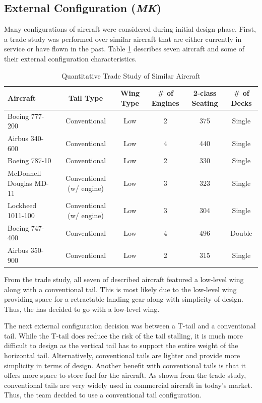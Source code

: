 \subsection{External Configuration  (\textit{MK})}
Many configurations of aircraft were considered during initial design phase. First, a trade study was performed over similar aircraft that are either currently in service or have flown in the past. Table \ref{tabmk1} describes seven aircraft and some of their external configuration characteristics. 

\begin{table}[H]
    \centering
    \caption{Quantitative Trade Study of Similar Aircraft}
    \begin{tabular}{|m{3cm}||c|c|c|c|c|}
    \toprule
    \label{tabmk1}
    \textbf{Aircraft} & \textbf{Tail Type} & \textbf{Wing Type} & \textbf{\# of Engines} & \textbf{2-class Seating} & \textbf{\# of Decks} \\
    \hline\hline
    Boeing 777-200 & Conventional & Low & 2 & 375 & Single \\
    \hline
    Airbus 340-600 & Conventional & Low & 4 & 440 & Single \\
    \hline
    Boeing 787-10 & Conventional & Low & 2 & 330 & Single \\
    \hline
    McDonnell Douglas MD-11 & Conventional (w/ engine) & Low & 3 & 323 & Single \\
    \hline
    Lockheed 1011-100 & Conventional (w/ engine) & Low & 3 & 304 & Single \\
    \hline
    Boeing 747-400 & Conventional & Low & 4 & 496 & Double \\
    \hline
    Airbus 350-900 & Conventional & Low & 2 & 315 & Single \\
    \bottomrule
    \end{tabular}
\end{table}
\clearpage
From the trade study, all seven of described aircraft featured a low-level wing along with a conventional tail. This is most likely due to the low-level wing providing space for a retractable landing gear along with simplicity of design. Thus, the has decided to go with a low-level wing.

The next external configuration decision was between a T-tail and a conventional tail. While the T-tail does reduce the risk of the tail stalling, it is much more difficult to design as the vertical tail has to support the entire weight of the horizontal tail. Alternatively, conventional tails are lighter and provide more simplicity in terms of design. Another benefit with conventional tails is that it offers more space to store fuel for the aircraft. As shown from the trade study, conventional tails are very widely used in commercial aircraft in today's market. Thus, the team decided to use a conventional tail configuration. 

